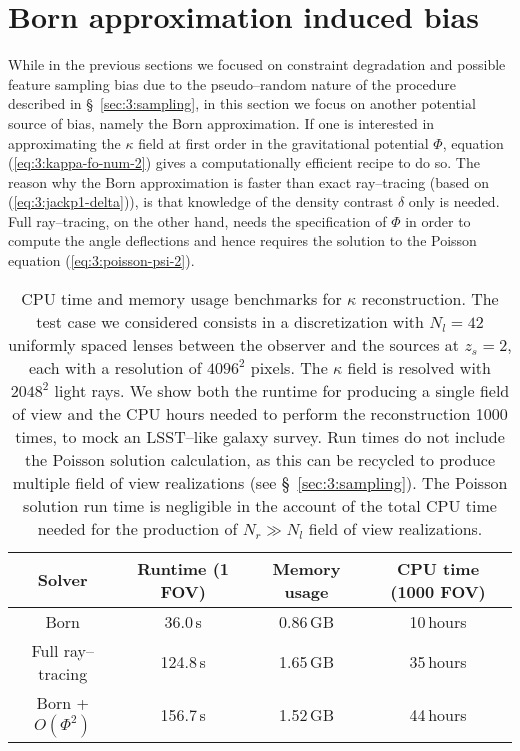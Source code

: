 \section{Born approximation induced bias}
While in the previous sections we focused on constraint degradation and possible feature sampling bias due to the pseudo--random nature of the procedure described in \S~\ref{sec:3:sampling}, in this section we focus on another potential source of bias, namely the Born approximation. If one is interested in approximating the $\kappa$ field at first order in the gravitational potential $\Phi$, equation (\ref{eq:3:kappa-fo-num-2}) gives a computationally efficient recipe to do so. The reason why the Born approximation is faster than exact ray--tracing (based on (\ref{eq:3:jackp1-delta})), is that knowledge of the density contrast $\delta$ only is needed. Full ray--tracing, on the other hand, needs the specification of $\Phi$ in order to compute the angle deflections and hence requires the solution to the Poisson equation (\ref{eq:3:poisson-psi-2}). 
%
\begin{table}
\begin{center}
\begin{tabular}{c|c|c|c}
\textbf{Solver} & \textbf{Runtime (1 FOV)} & \textbf{Memory usage} & \textbf{CPU time (1000 FOV)} \\ \hline \hline
Born & 36.0\,s & 0.86\,GB & 10\,hours  \\
Full ray--tracing & 124.8\,s & 1.65\,GB & 35\,hours  \\
Born + $O(\Phi^2)$ & 156.7\,s & 1.52\,GB & 44\,hours \\ \hline
\end{tabular}
\end{center}
\caption{CPU time and memory usage benchmarks for $\kappa$ reconstruction. The test case we considered consists in a discretization with $N_l=42$ uniformly spaced lenses between the observer and the sources at $z_s=2$, each with a resolution of $4096^2$ pixels. The $\kappa$ field is resolved with $2048^2$ light rays. We show both the runtime for producing a single field of view and the CPU hours needed to perform the reconstruction 1000 times, to mock an LSST--like galaxy survey. Run times do not include the Poisson solution calculation, as this can be recycled to produce multiple field of view realizations (see \S~\ref{sec:3:sampling}). The Poisson solution run time is negligible in the account of the total CPU time needed for the production of $N_r\gg N_l$ field of view realizations.}
\label{tab:5:benchmarks}
\end{table}
